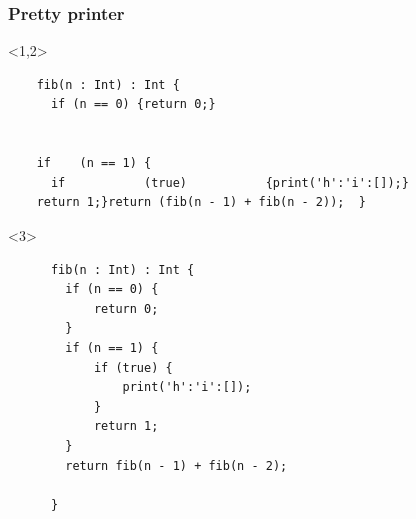 \documentclass{beamer}
\begin{document}
\begin{frame}[fragile]
  \frametitle{Pretty printer}

  \begin{onlyenv}<1,2>
  \begin{verbatim}
    fib(n : Int) : Int {
      if (n == 0) {return 0;}


    if    (n == 1) {
      if           (true)           {print('h':'i':[]);}
    return 1;}return (fib(n - 1) + fib(n - 2));  }
    \end{verbatim}
  \end{onlyenv}

  \begin{onlyenv}<3>
    \begin{verbatim}
      fib(n : Int) : Int {
        if (n == 0) {
            return 0;
        }
        if (n == 1) {
            if (true) {
                print('h':'i':[]);
            }
            return 1;
        }
        return fib(n - 1) + fib(n - 2);

      }
    \end{verbatim}
  \end{onlyenv}
\end{frame}
\end{document}

